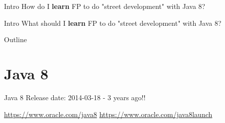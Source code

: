 \documentclass[14pt]{beamer}
\begin{document}
\begin{frame}{Intro}
    \huge How do I \textbf{learn} FP to do "street development" with Java 8?
\end{frame}

\begin{frame}{Intro}
    \huge What should I \textbf{learn} FP to do "street development" with Java 8?
\end{frame}

 \begin{frame}{Outline}
    \tableofcontents
\end{frame}

\section{Java 8}
\begin{frame}{Java 8}
    Release date: 2014-03-18 - 3 years ago!!
    
\href{https://www.oracle.com/java8}{https://www.oracle.com/java8}
\href{https://www.oracle.com/java8launch}{https://www.oracle.com/java8launch}
\end{frame}
\end{document}
